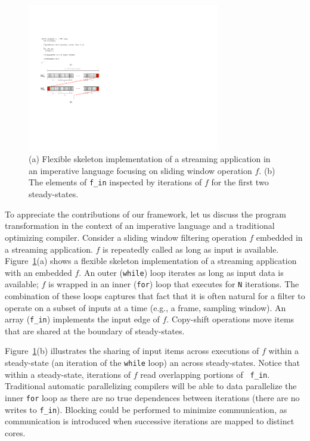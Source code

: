 \begin{figure}[t]
\centering
\includegraphics[width=3.3in]{figures/early-example.pdf}
\caption{(a) Flexible skeleton implementation of a streaming
  application in an imperative language focusing on sliding window
  operation $f$. (b) The elements of {\tt f\_in} inspected by
  iterations of $f$ for the first two steady-states.
\label{fig:comparison}}
\vspace{-10pt}
\end{figure}

To appreciate the contributions of our framework, let us discuss the
program transformation in the context of an imperative language and a
traditional optimizing compiler.  Consider a sliding window filtering
operation $f$ embedded in a streaming application.  $f$ is repeatedly
called as long as input is available.  Figure~\ref{fig:comparison}(a)
shows a flexible skeleton implementation of a streaming application
with an embedded $f$.  An outer ({\tt while}) loop iterates as long as
input data is available; $f$ is wrapped in an inner ({\tt for}) loop
that executes for {\tt N} iterations.  The combination of these loops
captures that fact that it is often natural for a filter to operate on
a subset of inputs at a time (e.g., a frame, sampling window). An
array ({\tt f\_in}) implements the input edge of $f$.  Copy-shift
operations move items that are shared at the boundary of
steady-states. 

Figure~\ref{fig:comparison}(b) illustrates the sharing of input items
across executions of $f$ within a steady-state (an iteration of the
{\tt while} loop) an across steady-states.  Notice that within a
steady-state, iterations of $f$ read overlapping portions of {\tt
  f\_in}.  Traditional automatic parallelizing compilers will be able
to data parallelize the inner {\tt for} loop as there are no true
dependences between iterations (there are no writes to {\tt f\_in}).
Blocking could be performed to minimize communication, as
communication is introduced when successive iterations are mapped to
distinct cores.  

